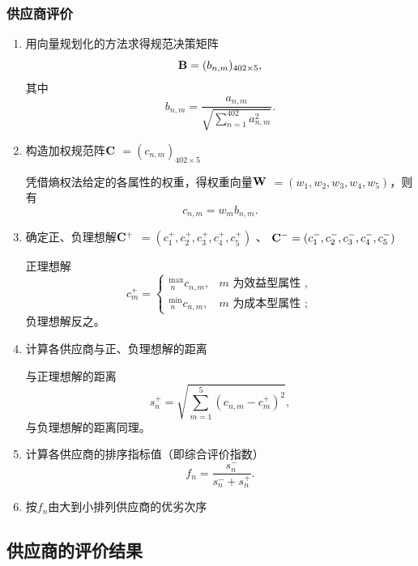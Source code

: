 \subsubsection{供应商评价}

\begin{enumerate}

\item 用向量规划化的方法求得规范决策矩阵
\begin{equation}
 {\bf B} =(b_{n,m})_{402 \times 5},
\end{equation}
其中
\begin{equation}
    b_{n,m}=\frac{a_{n,m}}{\sqrt{\sum_{n=1}^{402}a_{n,m}^2}}.
\end{equation}
\item 构造加权规范阵$ \bf C $ $=(c_{n,m})_{402 \times 5}$

凭借熵权法给定的各属性的权重，得权重向量$ \bf W $ $ =(w_1,w_2,w_3,w_4,w_5)$，则有
\begin{equation}
    c_{n,m}=w_mb_{n,m}.
\end{equation}
\item 确定正、负理想解$ \bf C^{+}$ $=(c_1^+,c_2^+,c_3^+,c_4^+,c_5^+)$
、
${\bf C^{-}}=(c_1^-,c_2^-,c_3^-,c_4^-,c_5^-)$

正理想解
\begin{equation}
c_{m}^{+}=\left\{\begin{array}{ll}
{ }_{\ n}^{\max } c_{n, m}, & m \text { 为效益型属性 }, \\
{ }_{\ n}^{\min } c_{n, m}, & m \text { 为成本型属性 };
\end{array}\right.
\end{equation}
负理想解反之。

\item 计算各供应商与正、负理想解的距离

与正理想解的距离
\begin{equation}
    s_n^+=\sqrt{\sum_{m=1}^5(c_{n,m}-c_m^+)^2} ,
\end{equation}
与负理想解的距离同理。
\item 计算各供应商的排序指标值（即综合评价指数）
\begin{equation}
    f_n=\frac{s_n^-}{s_n^-+s_n^+}.
\end{equation}
\item 按$f_n$由大到小排列供应商的优劣次序

\end{enumerate}

\subsection{供应商的评价结果}


